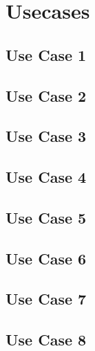 \section{Usecases}

\subsection{Use Case 1}


\subsection{Use Case 2}


\subsection{Use Case 3}


\subsection{Use Case 4}


\subsection{Use Case 5}


\subsection{Use Case 6}


\subsection{Use Case 7}



\subsection{Use Case 8}

